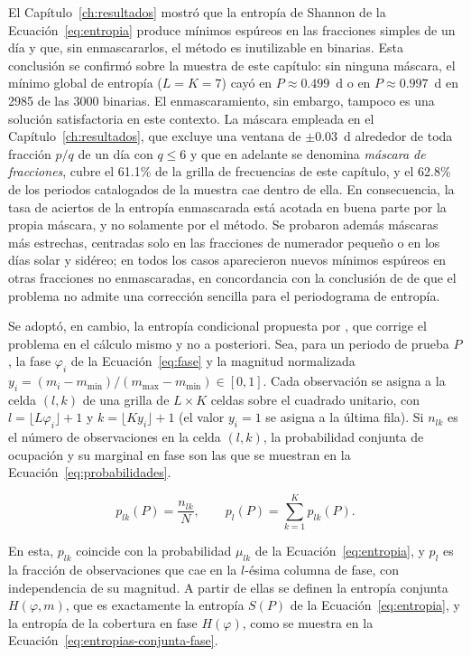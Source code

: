 \documentclass[12pt,letterpaper,oneside]{book}
\begin{document}
El Cap\'itulo~\ref{ch:resultados} mostr\'o que la entrop\'ia de Shannon de la Ecuaci\'on~\eqref{eq:entropia} produce m\'inimos esp\'ureos en las fracciones simples de un d\'ia y que, sin enmascararlos, el m\'etodo es inutilizable en binarias. Esta conclusi\'on se confirm\'o sobre la muestra de este cap\'itulo: sin ninguna m\'ascara, el m\'inimo global de entrop\'ia ($L=K=7$) cay\'o en $P\approx0.499$~d o en $P\approx0.997$~d en 2985 de las 3000 binarias. El enmascaramiento, sin embargo, tampoco es una soluci\'on satisfactoria en este contexto. La m\'ascara empleada en el Cap\'itulo~\ref{ch:resultados}, que excluye una ventana de $\pm0.03$~d alrededor de toda fracci\'on $p/q$ de un d\'ia con $q\leq6$ y que en adelante se denomina \emph{m\'ascara de fracciones}, cubre el 61.1\% de la grilla de frecuencias de este cap\'itulo, y el 62.8\% de los periodos catalogados de la muestra cae dentro de ella. En consecuencia, la tasa de aciertos de la entrop\'ia enmascarada est\'a acotada en buena parte por la propia m\'ascara, y no solamente por el m\'etodo. Se probaron adem\'as m\'ascaras m\'as estrechas, centradas solo en las fracciones de numerador peque\~no o en los d\'ias solar y sid\'ereo; en todos los casos aparecieron nuevos m\'inimos esp\'ureos en otras fracciones no enmascaradas, en concordancia con la conclusi\'on de \citet{Henao2021} de que el problema no admite una correcci\'on sencilla para el periodograma de entrop\'ia.

Se adopt\'o, en cambio, la entrop\'ia condicional propuesta por \citet{Graham2013b}, que corrige el problema en el c\'alculo mismo y no a posteriori. Sea, para un periodo de prueba $P$, la fase $\varphi_i$ de la Ecuaci\'on~\eqref{eq:fase} y la magnitud normalizada $y_i=(m_i-m_{\mathrm{min}})/(m_{\mathrm{max}}-m_{\mathrm{min}})\in[0,1]$. Cada observaci\'on se asigna a la celda $(l,k)$ de una grilla de $L\times K$ celdas sobre el cuadrado unitario, con $l=\lfloor L\varphi_i\rfloor+1$ y $k=\lfloor K y_i\rfloor+1$ (el valor $y_i=1$ se asigna a la \'ultima fila). Si $n_{lk}$ es el n\'umero de observaciones en la celda $(l,k)$, la probabilidad conjunta de ocupaci\'on y su marginal en fase son las que se muestran en la Ecuaci\'on~\eqref{eq:probabilidades}.

\begin{equation}
	p_{lk}(P) = \frac{n_{lk}}{N}, \qquad p_{l}(P) = \sum_{k=1}^{K} p_{lk}(P).
	\label{eq:probabilidades}
\end{equation}

En esta, $p_{lk}$ coincide con la probabilidad $\mu_{lk}$ de la Ecuaci\'on~\eqref{eq:entropia}, y $p_l$ es la fracci\'on de observaciones que cae en la $l$-\'esima columna de fase, con independencia de su magnitud. A partir de ellas se definen la entrop\'ia conjunta $H(\varphi,m)$, que es exactamente la entrop\'ia $S(P)$ de la Ecuaci\'on~\eqref{eq:entropia}, y la entrop\'ia de la cobertura en fase $H(\varphi)$, como se muestra en la Ecuaci\'on~\eqref{eq:entropias-conjunta-fase}.
\end{document}
